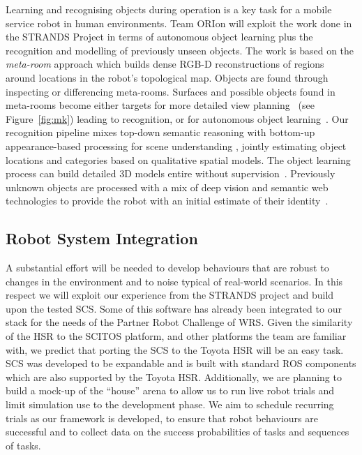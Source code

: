 \documentclass[runningheads,a4paper]{llncs}
\newcommand{\teamori}{Team ORIon}
\begin{document}
Learning and recognising objects during operation is a key task for a mobile service robot in human environments. \teamori{} will exploit the work done in the STRANDS Project in terms of autonomous object learning plus the recognition and modelling of previously unseen objects. The work is based on the \emph{meta-room} approach which builds dense RGB-D reconstructions of regions around locations in the robot's topological map. Objects are found through inspecting or differencing meta-rooms. Surfaces and possible objects found in meta-rooms become either targets for more detailed view planning~\cite{kunze14indirect} (see Figure~\ref{fig:mk}) leading to recognition, or for autonomous object learning~\cite{Faeulhammer:2016}. Our recognition pipeline mixes top-down semantic reasoning with bottom-up appearance-based processing for scene understanding \cite{kunze14topdown}, jointly estimating object locations and categories based on qualitative spatial models\cite{kunze14bootstrapping}. The object learning process can build detailed 3D models entire without supervision~\cite{Faeulhammer:2016}. Previously unknown  objects are processed with a mix of deep vision and semantic web technologies to provide the robot with an initial estimate of their identity~\cite{aloof@icra17}.



\subsection{Robot System Integration}

A substantial effort will be needed to develop behaviours that are robust to
changes in the environment and to noise typical of real-world scenarios. In this
respect we will exploit our experience from the STRANDS project 
\cite{strands@ram} and build upon the tested SCS. Some of this software has already been integrated to our stack for the needs of the Partner Robot Challenge of WRS.
Given the similarity of the HSR to the SCITOS platform, and other platforms the team are familiar with, %
we predict that porting the
SCS to the Toyota HSR will be an easy task. SCS was developed to be 
expandable and is built with standard ROS components which are also supported 
by the Toyota HSR. 
Additionally, we are planning to build a mock-up of the ``house'' arena to
allow us to run live robot trials and limit simulation use to the development
phase. We aim to schedule recurring trials as our framework is developed, to
ensure that robot behaviours are successful and to collect data on the 
success probabilities of tasks and sequences of tasks.
\end{document}
